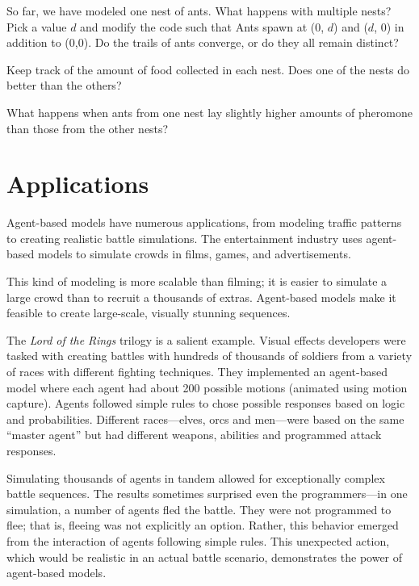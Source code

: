\documentclass[10pt]{book}
\begin{document}
\begin{exercise}

So far, we have modeled one nest of ants.
What happens with multiple nests? Pick a value $d$ and
modify the code such that Ants spawn at (0, $d$) and ($d$, 0) in addition
to (0,0).  Do the trails of ants converge, or do they all remain
distinct? 

Keep track of the amount of food
collected in each nest. Does one of the nests do better than the
others?

What happens when ants from
one nest lay slightly higher amounts of pheromone than those from the
other nests?
\end{exercise}


\section{Applications}

Agent-based models have numerous applications,
from modeling traffic patterns to creating realistic battle
simulations.  The entertainment industry uses agent-based
models to simulate crowds in films, games, and advertisements.

This kind of modeling is more scalable than filming; it is easier to
simulate a large crowd than to recruit a thousands of extras.
Agent-based models make it feasible to create large-scale, visually
stunning sequences.

The \emph{Lord of the Rings} trilogy is a salient example.  Visual
effects developers were tasked with creating battles with hundreds of
thousands of soldiers from a variety of races with different fighting
techniques.  They implemented an agent-based model where each agent
had about 200 possible motions (animated using motion capture).
Agents followed simple rules to chose possible responses based on
logic and probabilities.  Different races---elves, orcs and
men---were based on the same ``master agent'' but had different
weapons, abilities and programmed attack responses.

Simulating thousands of agents in tandem allowed for exceptionally
complex battle sequences.  The results sometimes surprised even the
programmers---in one simulation, a number of agents fled the battle.
They were not programmed to flee; that is, fleeing was not explicitly
an option.  Rather, this behavior emerged from the interaction of
agents following simple rules.
This unexpected action, which would be realistic in
an actual battle scenario, demonstrates the power of agent-based models.
\end{document}

